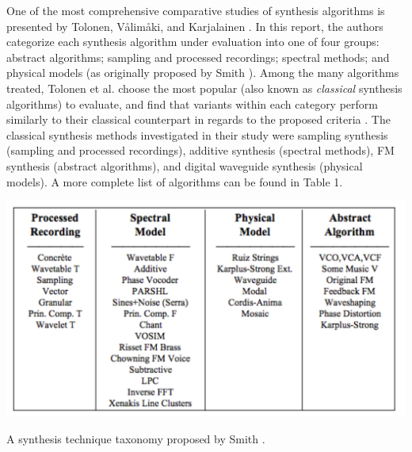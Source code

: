 \documentclass[12pt]{report} 	%
\numberwithin{figure}{chapter}
\numberwithin{table}{chapter}
\numberwithin{equation}{chapter}
\begin{document}
\begin{flushleft}
One of the most comprehensive comparative studies of synthesis algorithms is presented by Tolonen, V\aa lim\aa ki, and Karjalainen \cite{Tolonen:1998bh}. In this report, the authors categorize each synthesis algorithm under evaluation into one of four groups: abstract algorithms; sampling and processed recordings; spectral methods; and physical models (as originally proposed by Smith \cite{III:1991hc}). Among the many algorithms treated, Tolonen et al. choose the most popular (also known as \textit{classical} synthesis algorithms) to evaluate, and find that variants within each category perform similarly to their classical counterpart in regards to the proposed criteria \cite[p. 101]{Tolonen:1998bh}. The classical synthesis methods investigated in their study were sampling synthesis (sampling and processed recordings), additive synthesis (spectral methods), FM synthesis (abstract algorithms), and digital waveguide synthesis (physical models). A more complete list of algorithms can be found in Table 1.
\begin{table}[h!]
\vspace{24pt}
\begin{center}
\includegraphics[scale=0.7]{SynthesisTechniqueTaxonomy}
\caption[Synthesis technique taxonomy]{A synthesis technique taxonomy proposed by Smith \protect\cite{III:1991hc}.}
\end{center}
\vspace{6pt}
\end{table}


\end{flushleft}
\end{document}
